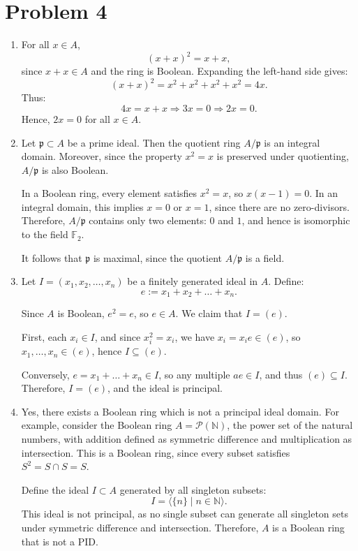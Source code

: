 \documentclass[12pt]{article}
\begin{document}
\section*{Problem 4}
\begin{enumerate}[label=(\arabic*)]
\item
For all \( x \in A \),
\[
(x + x)^2 = x + x,
\]
since \( x + x \in A \) and the ring is Boolean. Expanding the left-hand side gives:
\[
(x + x)^2 = x^2 + x^2 + x^2 + x^2 = 4x.
\]
Thus:
\[
4x = x + x \Rightarrow 3x = 0 \Rightarrow 2x = 0.
\]
Hence, \( 2x = 0 \) for all \( x \in A \).

\item
Let \( \mathfrak{p} \subset A \) be a prime ideal. Then the quotient ring \( A/\mathfrak{p} \) is an integral domain. Moreover, since the property \( x^2 = x \) is preserved under quotienting, \( A/\mathfrak{p} \) is also Boolean.

In a Boolean ring, every element satisfies \( x^2 = x \), so \( x(x - 1) = 0 \). In an integral domain, this implies \( x = 0 \) or \( x = 1 \), since there are no zero-divisors. Therefore, \( A/\mathfrak{p} \) contains only two elements: \( 0 \) and \( 1 \), and hence is isomorphic to the field \( \mathbb{F}_2 \).

It follows that \( \mathfrak{p} \) is maximal, since the quotient \( A/\mathfrak{p} \) is a field.

\item
Let \( I = (x_1, x_2, \dots, x_n) \) be a finitely generated ideal in \( A \). Define:
\[
e := x_1 + x_2 + \dots + x_n.
\]

Since \( A \) is Boolean, \( e^2 = e \), so \( e \in A \). We claim that \( I = (e) \).

First, each \( x_i \in I \), and since \( x_i^2 = x_i \), we have \( x_i = x_i e \in (e) \), so \( x_1, \dots, x_n \in (e) \), hence \( I \subseteq (e) \).

Conversely, \( e = x_1 + \dots + x_n \in I \), so any multiple \( ae \in I \), and thus \( (e) \subseteq I \). Therefore, \( I = (e) \), and the ideal is principal.

\item
Yes, there exists a Boolean ring which is not a principal ideal domain. For example, consider the Boolean ring \( A = \mathcal{P}(\mathbb{N}) \), the power set of the natural numbers, with addition defined as symmetric difference and multiplication as intersection. This is a Boolean ring, since every subset satisfies \( S^2 = S \cap S = S \).

Define the ideal \( I \subset A \) generated by all singleton subsets:
\[
I = \langle \{n\} \mid n \in \mathbb{N} \rangle.
\]
This ideal is not principal, as no single subset can generate all singleton sets under symmetric difference and intersection. Therefore, \( A \) is a Boolean ring that is not a PID.


\end{enumerate}
\end{document}
